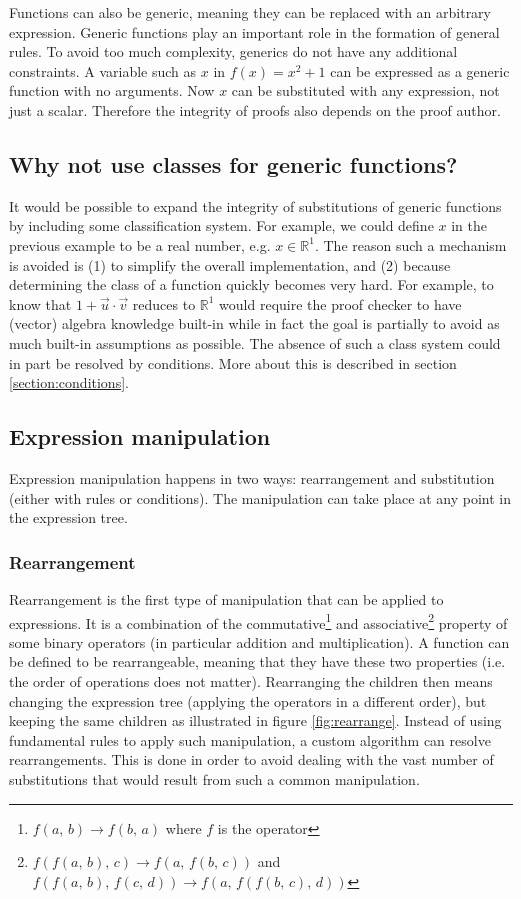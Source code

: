 \documentclass{article}
\begin{document}
Functions can also be generic, meaning they can be replaced with an arbitrary expression. Generic functions play an important role in the formation of general rules. To avoid too much complexity, generics do not have any additional constraints. A variable such as $x$ in $f(x)=x^2+1$ can be expressed as a  generic function with no arguments. Now $x$ can be substituted with any expression, not just a scalar. Therefore the integrity of proofs also depends on the proof author.

\subsection{Why not use classes for generic functions?}
It would be possible to expand the integrity of substitutions of generic functions by including some classification system. For example, we could define $x$ in the previous example to be a real number, e.g. $x\in\mathbb{R}^1$. The reason such a mechanism is avoided is (1) to simplify the overall implementation, and (2) because determining the class of a function quickly becomes very hard. For example, to know that $1+\vec{u}\cdot\vec{v}$ reduces to $\mathbb{R}^1$ would require the proof checker to have (vector) algebra knowledge built-in while in fact the goal is partially to avoid as much built-in assumptions as possible. The absence of such a class system could in part be resolved by conditions. More about this is described in section \ref{section:conditions}.

\subsection{Expression manipulation}
\label{section:expression-manipulation}
Expression manipulation happens in two ways: rearrangement and substitution (either with rules or conditions). The manipulation can take place at any point in the expression tree.

\subsubsection{Rearrangement}
Rearrangement is the first type of manipulation that can be applied to expressions. It is a combination of the commutative\footnote{$f(a,\,b)\rightarrow f(b,\,a)$ where $f$ is the operator} and associative\footnote{$f(f(a,\,b),\,c)\rightarrow f(a,\,f(b,\,c))$ and $f(f(a,\,b),\,f(c,\,d))\rightarrow f(a,\,f(f(b,\,c),\,d))$} property of some binary operators (in particular addition and multiplication). A function can be defined to be rearrangeable, meaning that they have these two properties (i.e. the order of operations does not matter). Rearranging the children then means changing the expression tree (applying the operators in a different order), but keeping the same children as illustrated in figure \ref{fig:rearrange}. Instead of using fundamental rules to apply such manipulation, a custom algorithm can resolve rearrangements. This is done in order to avoid dealing with the vast number of substitutions that would result from such a common manipulation.
\end{document}

